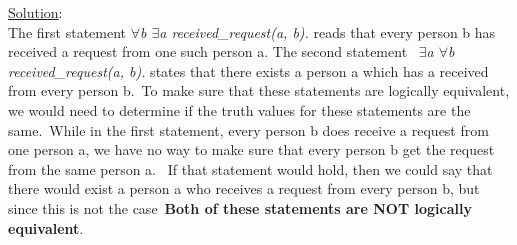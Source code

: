 \begin{enumerate}
    \noindent \underline{Solution}:\\ The first statement \emph{$\forall$b $\exists$a received\_request(a, b).} reads that every person b has received a request from one such person a. The second statement \
    \emph{$\exists$a $\forall$b received\_request(a, b).} states that there exists a person a which has a received from every person b.\
    To make sure that these statements are logically equivalent, we would need to determine if the truth values for these statements are the same.\
    While in the first statement, every person b does receive a request from one person a, we have no way to make sure that every person b get the request from the same person a. \
    If that statement would hold, then we could say that there would exist a person a who receives a request from every person b, but since this is not the case\
    \textbf{Both of these statements are NOT logically equivalent}.

    

    
\end{enumerate}   
 